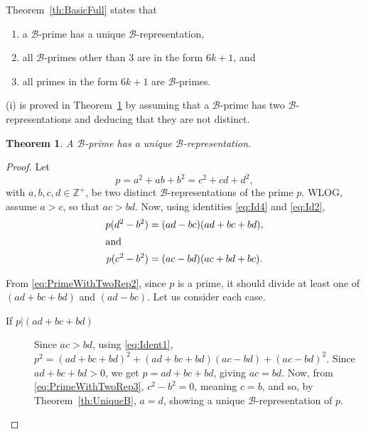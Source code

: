 \documentclass[reqno]{amsart}
\newtheorem{theorem}{Theorem}
\newcommand{\bprime} {\ensuremath{\mathcal B}-prime}
\newcommand{\brep}   {\ensuremath{\mathcal B}-representation}
\newcommand{\bq}[2]{\ensuremath{{#1}^2 + {#1}{#2} + {#2}^2}}
\newcommand{\bqab}{\bq{a}{b}}
\newcommand{\bqcd}{\bq{c}{d}}
\newcommand{\Positive}{\ensuremath{\mathbb{Z^+}}}
\begin{document}
Theorem~\ref{th:BasicFull} states
that 
\begin{enumerate}
\item[(i)] a \bprime{} has a unique
\brep{}, 
\item[(ii)] all \bprime{}s other than $3$ are in the form
$6k+1$, and 
\item[(iii)] all primes in the form $6k+1$ are
\bprime{}s.
\end{enumerate}

(i) is proved in Theorem~\ref{th:PrimeUniqueRep} by assuming that
a \bprime{} has two \brep{}s and deducing that they are
not distinct.  
\begin{theorem}
  A \bprime{} has a unique \brep{}.
  \label{th:PrimeUniqueRep}
\end{theorem}
\begin{proof}
  Let
  \begin{equation}
    \label{eq:PrimeWithTwoRep}
    p = \bqab = \bqcd,
  \end{equation}
  with $a,b,c,d \in \Positive$, be two distinct \brep{}s of
  the prime $p$.
  WLOG, assume $a>c$, so that $ac>bd$.
  Now, using identities \eqref{eq:Id4} and \eqref{eq:Id2},
  \begin{subequations}
    \begin{align}
      p(d^2-b^2) &= (ad-bc)(ad+bc+bd),
      \label{eq:PrimeWithTwoRep2} \\ 
      \intertext{and}
      p(c^2-b^2) &= (ac-bd)(ac+bd+bc). \label{eq:PrimeWithTwoRep3}
    \end{align}
  \end{subequations}

  From \eqref{eq:PrimeWithTwoRep2}, since $p$ is a prime, it should divide at least one of
  $(ad+bc+bd)$ and $(ad-bc)$.  Let us consider each case.

  \begin{description}
  \item [If \boldmath$p|(ad+bc+bd)$\unboldmath] Since $ac>bd$, using \eqref{eq:Ident1},
    $p^2 = \bq{(ad+bc+bd)}{(ac-bd)}$.  Since $ad+bc+bd > 0$, we
    get $p = ad+bc+bd$, giving $ac = bd$.  Now, from
    \eqref{eq:PrimeWithTwoRep3}, $c^2-b^2 = 0$, meaning $c=b$,
    and so, by Theorem~\ref{th:UniqueB}, $a=d$, showing a unique \brep{} of $p$.
    

\end{description}
\end{proof}
\end{document}
